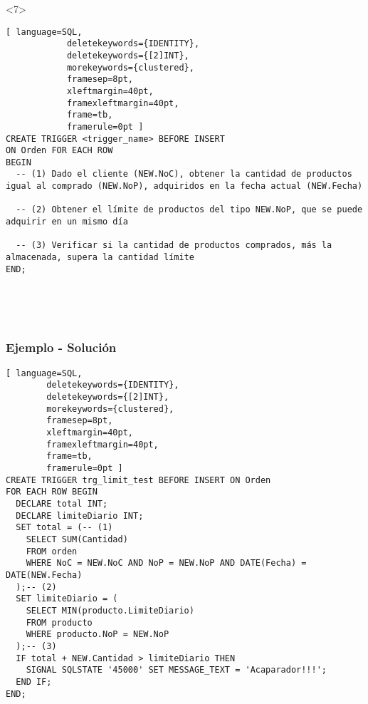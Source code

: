 \begin{frame}[fragile]
		\begin{onlyenv}<7>
		\begin{lstlisting}[ language=SQL,
			deletekeywords={IDENTITY},
			deletekeywords={[2]INT},
			morekeywords={clustered},
			framesep=8pt,
			xleftmargin=40pt,
			framexleftmargin=40pt,
			frame=tb,
			framerule=0pt ]
CREATE TRIGGER <trigger_name> BEFORE INSERT 
ON Orden FOR EACH ROW 
BEGIN
  -- (1) Dado el cliente (NEW.NoC), obtener la cantidad de productos igual al comprado (NEW.NoP), adquiridos en la fecha actual (NEW.Fecha)
  
  -- (2) Obtener el límite de productos del tipo NEW.NoP, que se puede adquirir en un mismo día
  
  -- (3) Verificar si la cantidad de productos comprados, más la almacenada, supera la cantidad límite
END;
\end{lstlisting}
\end{onlyenv}
		
	\ 
	
	\ 
	
	
	
	
\end{frame}


\begin{frame}[fragile]
	
	\frametitle{Ejemplo - Solución}
	
	\begin{lstlisting}[ language=SQL,
		deletekeywords={IDENTITY},
		deletekeywords={[2]INT},
		morekeywords={clustered},
		framesep=8pt,
		xleftmargin=40pt,
		framexleftmargin=40pt,
		frame=tb,
		framerule=0pt ]
CREATE TRIGGER trg_limit_test BEFORE INSERT ON Orden 
FOR EACH ROW BEGIN
  DECLARE total INT;
  DECLARE limiteDiario INT;
  SET total = (-- (1) 
    SELECT SUM(Cantidad) 
    FROM orden 
    WHERE NoC = NEW.NoC AND NoP = NEW.NoP AND DATE(Fecha) = DATE(NEW.Fecha)
  );-- (2)
  SET limiteDiario = (
    SELECT MIN(producto.LimiteDiario) 
    FROM producto 
    WHERE producto.NoP = NEW.NoP
  );-- (3)
  IF total + NEW.Cantidad > limiteDiario THEN
    SIGNAL SQLSTATE '45000' SET MESSAGE_TEXT = 'Acaparador!!!';
  END IF;
END;
\end{lstlisting}

\end{frame}

